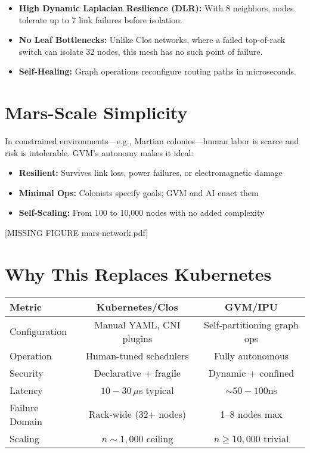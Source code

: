 \documentclass[../../../OAE-SPEC-MAIN.tex]{subfiles}
\begin{document}
\begin{itemize}
  \item \textbf{High Dynamic Laplacian Resilience (DLR):} With 8 neighbors, nodes tolerate up to 7 link failures before isolation.
  \item \textbf{No Leaf Bottlenecks:} Unlike Clos networks, where a failed top-of-rack switch can isolate 32 nodes, this mesh has no such point of failure.
  \item \textbf{Self-Healing:} Graph operations reconfigure routing paths in microseconds.
\end{itemize}

\section{Mars-Scale Simplicity}

In constrained environments—e.g., Martian colonies—human labor is scarce and risk is intolerable. GVM’s autonomy makes it ideal:

\begin{itemize}
  \item \textbf{Resilient:} Survives link loss, power failures, or electromagnetic damage
  \item \textbf{Minimal Ops:} Colonists specify goals; GVM and AI enact them
  \item \textbf{Self-Scaling:} From 100 to 10,000 nodes with no added complexity
\end{itemize}

[MISSING FIGURE mars-network.pdf]

\section{Why This Replaces Kubernetes}

\begin{center}
\begin{tabular}{lcc}
\toprule
\textbf{Metric} & \textbf{Kubernetes/Clos} & \textbf{GVM/IPU} \\
\midrule
Configuration   & Manual YAML, CNI plugins & Self-partitioning graph ops \\
Operation       & Human-tuned schedulers   & Fully autonomous \\
Security        & Declarative + fragile    & Dynamic + confined \\
Latency         & $10{-}30\,\mu$s typical  & $\sim 50{-}100$ns \\
Failure Domain  & Rack-wide (32+ nodes)    & 1–8 nodes max \\
Scaling         & $n \sim 1,000$ ceiling   & $n \geq 10,000$ trivial \\
\bottomrule
\end{tabular}
\end{center}
\end{document}
